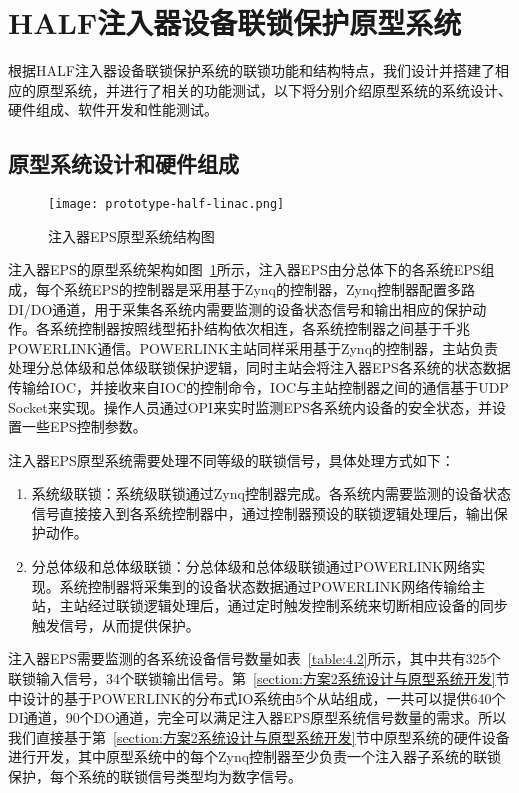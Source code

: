 \section{HALF注入器设备联锁保护原型系统}

根据HALF注入器设备联锁保护系统的联锁功能和结构特点，我们设计并搭建了相应的原型系统，并进行了相关的功能测试，以下将分别介绍原型系统的系统设计、硬件组成、软件开发和性能测试。

\subsection{原型系统设计和硬件组成}

\begin{figure}[!htb]
	\centering
	\texttt{[image: prototype-half-linac.png]}
	\caption{注入器EPS原型系统结构图}
	\label{fig:prototype-half-linac}
\end{figure}

注入器EPS的原型系统架构如图~\ref{fig:prototype-half-linac}所示，注入器EPS由分总体下的各系统EPS组成，每个系统EPS的控制器是采用基于Zynq的控制器，Zynq控制器配置多路DI/DO通道，用于采集各系统内需要监测的设备状态信号和输出相应的保护动作。各系统控制器按照线型拓扑结构依次相连，各系统控制器之间基于千兆POWERLINK通信。POWERLINK主站同样采用基于Zynq的控制器，主站负责处理分总体级和总体级联锁保护逻辑，同时主站会将注入器EPS各系统的状态数据传输给IOC，并接收来自IOC的控制命令，IOC与主站控制器之间的通信基于UDP Socket来实现。操作人员通过OPI来实时监测EPS各系统内设备的安全状态，并设置一些EPS控制参数。

注入器EPS原型系统需要处理不同等级的联锁信号，具体处理方式如下：

\begin{enumerate}
  \item 系统级联锁：系统级联锁通过Zynq控制器完成。各系统内需要监测的设备状态信号直接接入到各系统控制器中，通过控制器预设的联锁逻辑处理后，输出保护动作。

  \item 分总体级和总体级联锁：分总体级和总体级联锁通过POWERLINK网络实现。系统控制器将采集到的设备状态数据通过POWERLINK网络传输给主站，主站经过联锁逻辑处理后，通过定时触发控制系统来切断相应设备的同步触发信号，从而提供保护。

\end{enumerate}

注入器EPS需要监测的各系统设备信号数量如表~\ref{table:4.2}所示，其中共有325个联锁输入信号，34个联锁输出信号。第~\ref{section:方案2系统设计与原型系统开发}节中设计的基于POWERLINK的分布式IO系统由5个从站组成，一共可以提供640个DI通道，90个DO通道，完全可以满足注入器EPS原型系统信号数量的需求。所以我们直接基于第~\ref{section:方案2系统设计与原型系统开发}节中原型系统的硬件设备进行开发，其中原型系统中的每个Zynq控制器至少负责一个注入器子系统的联锁保护，每个系统的联锁信号类型均为数字信号。

